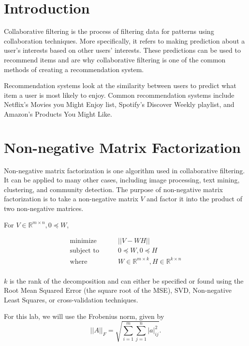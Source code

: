 

\section*{Introduction}
Collaborative filtering is the process of filtering data for patterns using collaboration techniques.
More specifically, it refers to making prediction about a user's interests based on other users' interests.
These predictions can be used to recommend items and are why collaborative filtering is one of the common methods of creating a recommendation system.

Recommendation systems look at the similarity between users to predict what item a user is most likely to enjoy.
Common recommendation systems include Netflix's Movies you Might Enjoy list, Spotify's Discover Weekly playlist, and Amazon's Products You Might Like.


\section*{Non-negative Matrix Factorization}
Non-negative matrix factorization is one algorithm used in collaborative filtering.
It can be applied to many other cases, including image processing, text mining, clustering, and community detection.
The purpose of non-negative matrix factorization is to take a non-negative matrix $V$ and factor it into the product of two non-negative matrices.

For $V\in\mathbb{R}^{m\times n}, 0\preceq W$,


\begin{align*}
\text{minimize}\qquad & ||V-WH|| \\
\text{subject to}\qquad &  0\preceq W, 0\preceq H\\
\text{where}\qquad & W\in\mathbb{R}^{m\times k}, H\in\mathbb{R}^{k\times n}\\
\end{align*}


$k$ is the rank of the decomposition and can either be specified or found using the Root Mean Squared Error (the square root of the MSE), SVD, Non-negative Least Squares, or cross-validation techniques.

For this lab, we will use the Frobenius norm, given by
\[
||A||_{F} = \sqrt{\sum_{i=1}^{m}\sum_{j=1}^{n} |a|_{ij}^{2}}.
\]

